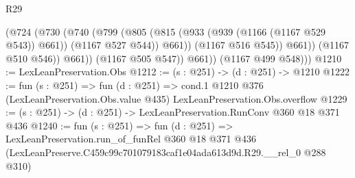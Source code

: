 \begin{lexlean}{R29}
\begin{coremodule}
                    (@724
                      (@730
                        (@740
                          (@799
                            (@805
                              (@815 (@933 (@939 (@1166 (@1167 @529 @543)) @661)) (@1167 @527 @544))
                              @661))
                          (@1167 @516 @545))
                        @661))
                    (@1167 @510 @546))
                  @661))
              (@1167 @505 @547))
            @661))
        (@1167 @499 @548)))
@1210 := LexLeanPreservation.Obs
@1212 := (s : @251) -> (d : @251) -> @1210
@1222 := fun (s : @251) =>
  fun (d : @251) =>
  cond.{1} @1210 @376 (LexLeanPreservation.Obs.value @435) LexLeanPreservation.Obs.overflow
@1229 := (s : @251) -> (d : @251) -> LexLeanPreservation.RunConv @360 @18 @371 @436
@1240 := fun (s : @251) =>
  fun (d : @251) =>
  LexLeanPreservation.run_of_funRel
    @360
    @18
    @371
    @436
    (LexLeanPreserve.C459c99c701079183caf1e04ada613d9d.R29.__rel_0 @288 @310)
\end{coremodule}
\end{lexlean}
